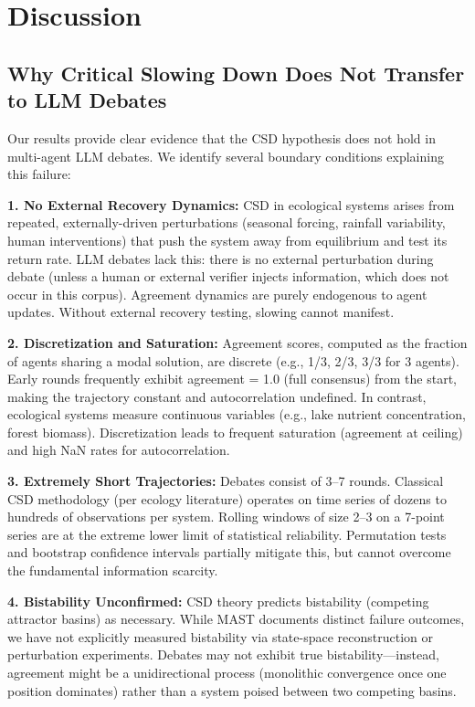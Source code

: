 \documentclass[11pt,letterpaper]{article}
\begin{document}
\section{Discussion}

\subsection{Why Critical Slowing Down Does Not Transfer to LLM Debates}

Our results provide clear evidence that the CSD hypothesis does not hold in multi-agent LLM debates. We identify several boundary conditions explaining this failure:

\textbf{1. No External Recovery Dynamics:} CSD in ecological systems arises from repeated, externally-driven perturbations (seasonal forcing, rainfall variability, human interventions) that push the system away from equilibrium and test its return rate. LLM debates lack this: there is no external perturbation during debate (unless a human or external verifier injects information, which does not occur in this corpus). Agreement dynamics are purely endogenous to agent updates. Without external recovery testing, slowing cannot manifest.

\textbf{2. Discretization and Saturation:} Agreement scores, computed as the fraction of agents sharing a modal solution, are discrete (e.g., 1/3, 2/3, 3/3 for 3 agents). Early rounds frequently exhibit agreement = 1.0 (full consensus) from the start, making the trajectory constant and autocorrelation undefined. In contrast, ecological systems measure continuous variables (e.g., lake nutrient concentration, forest biomass). Discretization leads to frequent saturation (agreement at ceiling) and high NaN rates for autocorrelation.

\textbf{3. Extremely Short Trajectories:} Debates consist of 3--7 rounds. Classical CSD methodology (per ecology literature) operates on time series of dozens to hundreds of observations per system. Rolling windows of size 2--3 on a 7-point series are at the extreme lower limit of statistical reliability. Permutation tests and bootstrap confidence intervals partially mitigate this, but cannot overcome the fundamental information scarcity.

\textbf{4. Bistability Unconfirmed:} CSD theory predicts bistability (competing attractor basins) as necessary. While MAST documents distinct failure outcomes, we have not explicitly measured bistability via state-space reconstruction or perturbation experiments. Debates may not exhibit true bistability---instead, agreement might be a unidirectional process (monolithic convergence once one position dominates) rather than a system poised between two competing basins.
\end{document}
